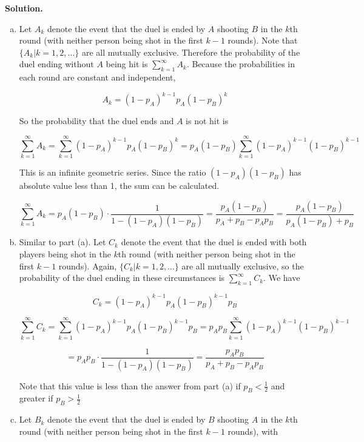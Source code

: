 \documentclass{article}
\begin{document}
\textbf{Solution.} \begin{enumerate}[(a)]

\item Let \(A_k\) denote the event that the duel is ended by \(A\) shooting \(B\) in the \(k\)th round (with neither person being shot in the first \(k - 1\) rounds). Note that \( \{A_k | k = 1, 2, \ldots\}\) are all mutually exclusive. Therefore the probability of the duel ending without \(A\) being hit is \(\sum_{k=1}^\infty A_k\). Because the probabilities in each round are constant and independent, 

\[
A_k = (1 - p_A)^{{k-1}}p_A(1 - p_B)^{k}
\]

So the probability that the duel ends and \(A\) is not hit is

\[
\sum_{k=1}^\infty A_k = \sum_{k=1}^\infty (1 - p_A)^{{k-1}}p_A(1 - p_B)^{k} = p_A (1 - p_B)\sum_{k=1}^\infty (1 - p_A)^{{k-1}}(1 - p_B)^{k-1} 
\]

This is an infinite geometric series. Since the ratio \((1 - p_A)(1 - p_B)\) has absolute value less than 1, the sum can be calculated.

\[
\sum_{k=1}^\infty A_k = p_A (1 - p_B) \cdot \frac{1}{1 - (1 - p_A)(1 - p_B)} = \frac{p_A (1 - p_B) }{p_A + p_B - p_Ap_B} = \boxed{\frac{p_A (1 - p_B) }{p_A(1 - p_B) + p_B}}
\]

\item Similar to part (a). Let \(C_k\) denote the event that the duel is ended with both players being shot in the \(k\)th round (with neither person being shot in the first \(k - 1\) rounds). Again, \( \{C_k | k = 1, 2, \ldots\}\) are all mutually exclusive, so the probability of the duel ending in these circumstances is \(\sum_{k=1}^\infty C_k\). We have

\[
C_k = (1 - p_A)^{{k-1}}p_A(1 - p_B)^{k-1}p_B
\]

\[
\sum_{k=1}^\infty C_k = \sum_{k=1}^\infty (1 - p_A)^{{k-1}}p_A(1 - p_B)^{k-1}p_B = p_A p_B\sum_{k=1}^\infty (1 - p_A)^{{k-1}}(1 - p_B)^{k-1} 
\]

\[
= p_A p_B \cdot \frac{1}{1 - (1 - p_A)(1 - p_B)} = \boxed{ \frac{p_A p_B }{p_A + p_B - p_Ap_B} }
\]

Note that this value is less than the answer from part (a) if \(p_B < \frac{1}{2}\) and greater if \(p_B > \frac{1}{2}\)

\item Let \(B_k\) denote the event that the duel is ended by \(B\) shooting \(A\) in the \(k\)th round (with neither person being shot in the first \(k - 1\) rounds), with


\end{enumerate}
\end{document}
